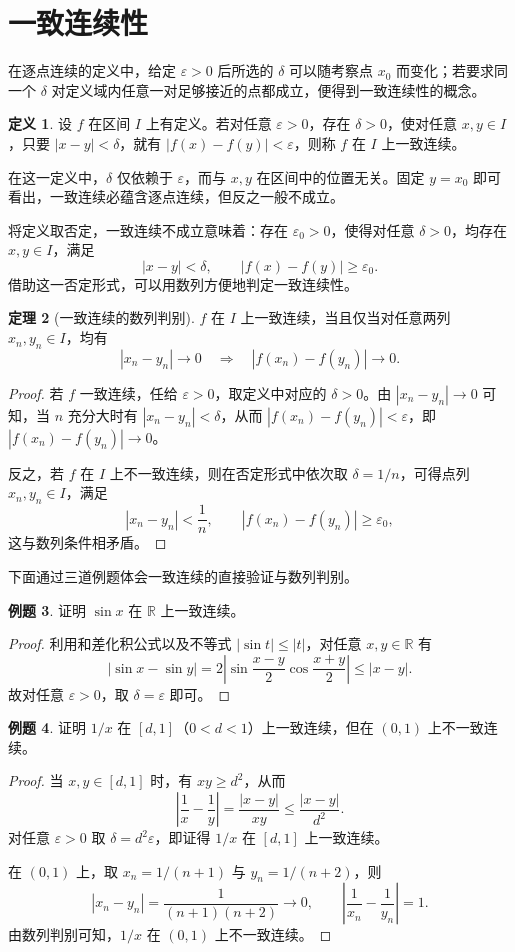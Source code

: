 \documentclass[UTF8,fontset=fandol,a4paper,12pt]{ctexart}
\newcommand{\R}{\mathbb R}
\theoremstyle{definition}
\newtheorem{definition}{定义}[section]
\newtheorem{theorem}[definition]{定理}
\newtheorem{example}[definition]{例题}
\begin{document}
\section{一致连续性}
在逐点连续的定义中，给定 $\varepsilon>0$ 后所选的 $\delta$ 可以随考察点 $x_0$ 而变化；若要求同一个 $\delta$ 对定义域内任意一对足够接近的点都成立，便得到一致连续性的概念。

\begin{definition}
设 $f$ 在区间 $I$ 上有定义。若对任意 $\varepsilon>0$，存在 $\delta>0$，使对任意 $x,y\in I$，只要 $|x-y|<\delta$，就有 $|f(x)-f(y)|<\varepsilon$，则称 $f$ 在 $I$ 上一致连续。
\end{definition}

在这一定义中，$\delta$ 仅依赖于 $\varepsilon$，而与 $x,y$ 在区间中的位置无关。固定 $y=x_0$ 即可看出，一致连续必蕴含逐点连续，但反之一般不成立。

将定义取否定，一致连续不成立意味着：存在 $\varepsilon_0>0$，使得对任意 $\delta>0$，均存在 $x,y\in I$，满足
\[
 |x-y|<\delta,\qquad |f(x)-f(y)|\ge\varepsilon_0.
\]
借助这一否定形式，可以用数列方便地判定一致连续性。

\begin{theorem}[一致连续的数列判别]
$f$ 在 $I$ 上一致连续，当且仅当对任意两列 $x_n,y_n\in I$，均有
\[
 |x_n-y_n|\to0\quad\Longrightarrow\quad
 |f(x_n)-f(y_n)|\to0.
\]
\end{theorem}
\begin{proof}
若 $f$ 一致连续，任给 $\varepsilon>0$，取定义中对应的 $\delta>0$。由 $|x_n-y_n|\to0$ 可知，当 $n$ 充分大时有 $|x_n-y_n|<\delta$，从而 $|f(x_n)-f(y_n)|<\varepsilon$，即 $|f(x_n)-f(y_n)|\to0$。

反之，若 $f$ 在 $I$ 上不一致连续，则在否定形式中依次取 $\delta=1/n$，可得点列 $x_n,y_n\in I$，满足
\[
 |x_n-y_n|<\frac1n,\qquad |f(x_n)-f(y_n)|\ge\varepsilon_0,
\]
这与数列条件相矛盾。
\end{proof}

下面通过三道例题体会一致连续的直接验证与数列判别。

\begin{example}
证明 $\sin x$ 在 $\R$ 上一致连续。
\end{example}
\begin{proof}
利用和差化积公式以及不等式 $|\sin t|\le|t|$，对任意 $x,y\in\R$ 有
\[
 |\sin x-\sin y|
 =2\left|\sin\frac{x-y}{2}\cos\frac{x+y}{2}\right|
 \le |x-y|.
\]
故对任意 $\varepsilon>0$，取 $\delta=\varepsilon$ 即可。
\end{proof}

\begin{example}
证明 $1/x$ 在 $[d,1]$（$0<d<1$）上一致连续，但在 $(0,1)$ 上不一致连续。
\end{example}
\begin{proof}
当 $x,y\in[d,1]$ 时，有 $xy\ge d^2$，从而
\[
 \left|\frac1x-\frac1y\right|=\frac{|x-y|}{xy}\le\frac{|x-y|}{d^2}.
\]
对任意 $\varepsilon>0$ 取 $\delta=d^2\varepsilon$，即证得 $1/x$ 在 $[d,1]$ 上一致连续。

在 $(0,1)$ 上，取 $x_n=1/(n+1)$ 与 $y_n=1/(n+2)$，则
\[
 |x_n-y_n|=\frac1{(n+1)(n+2)}\to0,
 \qquad \left|\frac1{x_n}-\frac1{y_n}\right|=1.
\]
由数列判别可知，$1/x$ 在 $(0,1)$ 上不一致连续。
\end{proof}
\end{document}
